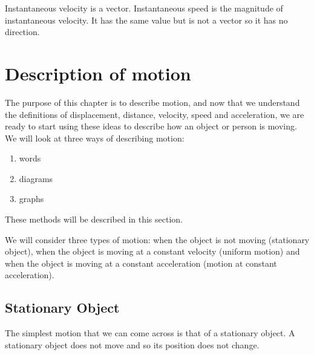 \label{m38791*id64664}Instantaneous velocity is a vector. Instantaneous speed is the magnitude of instantaneous velocity. It has the same value but is not a vector so it has no direction.


         \section{Description of motion}
    \nopagebreak
            \label{m38795*id68951}The purpose of this chapter is to describe motion, and now that we understand the definitions of displacement, distance, velocity, speed and acceleration, we are ready to start using these ideas to describe how an object or person is moving. We will look at three ways of describing motion:\par 
      \label{m38795*id68956}\begin{enumerate}[noitemsep, label=\textbf{\arabic*}. ] 
            \label{m38795*uid84}\item words
\label{m38795*uid85}\item diagrams
\label{m38795*uid86}\item graphs
\end{enumerate}
      \label{m38795*id68997}These methods will be described in this section.\par 
      \label{m38795*id69001}We will consider three types of motion: when the object is not moving (stationary object), when the object is moving at a constant velocity (uniform motion) and when the object is moving at a constant acceleration (motion at constant acceleration).\par 
      \label{m38795*uid87}
            \subsection*{Stationary Object}
            \nopagebreak
        \label{m38795*id69015}The simplest motion that we can come across is that of a stationary object. A stationary object does not move and so its position does not change.

